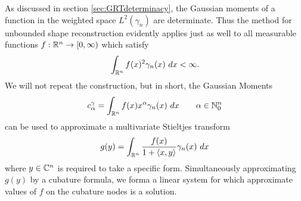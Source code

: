 As discussed in section \ref{sec:GRTdeterminacy}, the Gaussian moments of a function in the weighted space $L^2(\gamma_n)$ are determinate. Thus the method for unbounded shape reconstruction evidently applies just as well to all measurable functions $f: \mathbb{R}^n \to [0, \infty)$ which satisfy
\[
  \int_{\mathbb{R}^n} f(x)^2 \gamma_n(x) ~dx < \infty.
\]
We will not repeat the construction, but in short, the Gaussian Moments
\[
  c^\gamma_\alpha = \int_{\mathbb{R}^n} f(x) x^\alpha \gamma_n(x) ~dx \qquad \alpha \in \mathbb{N}_0^n
\]
can be used to approximate a multivariate Stieltjes transform
\[
  g(y) = \int_{\mathbb{R}^n} \frac{f(x)}{1 + \left\langle x, y \right\rangle} \gamma_n(x) ~dx
\]
where $y \in \mathbb{C}^n$ is required to take a specific form. Simultaneously approximating $g(y)$ by a cubature formula, we forma a linear system for which approximate values of $f$ on the cubature nodes is a solution. 






